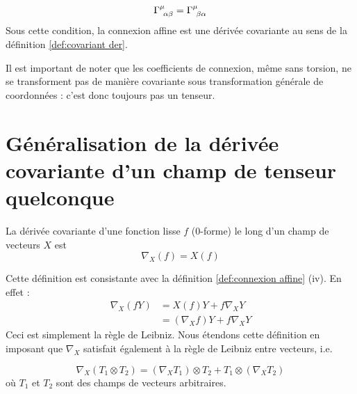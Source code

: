 \begin{equation}
    \Gamma\indices{^\mu_{\!\alpha\beta}} = \Gamma\indices{^\mu_{\!\beta \alpha}}
\end{equation}
Sous cette condition, la connexion affine est une dérivée covariante au sens de la définition \ref{def:covariant der}.
\begin{rmk}
    Il est important de noter que les coefficients de connexion, même sans torsion, ne se transforment pas de manière covariante sous transformation générale de coordonnées : c'est donc toujours pas un tenseur. 
\end{rmk}



\section{Généralisation de la dérivée covariante d'un champ de tenseur quelconque}
\begin{theoremframe}
    \begin{defi}
        La dérivée covariante d'une fonction lisse $f$ ($0$-forme) le long d'un champ de vecteurs $X$ est 
        \begin{equation}
            \nabla_{X}(f) = X(f)
            \label{dérivée covariante 0-forme}
        \end{equation}
    \end{defi}
\end{theoremframe}
Cette définition est consistante avec la définition \ref{def:connexion affine} (iv). En effet :
\begin{align*}
        \nabla_{X}(fY) &= X(f)Y + f\nabla_X Y\\
        &= (\nabla_X f)Y + f\nabla_X Y
    \label{regle de Liebniz}
\end{align*}
Ceci est simplement la règle de Leibniz. Nous étendons cette définition en imposant que $\nabla_X$ satisfait également à la règle de Leibniz entre vecteurs, i.e.

\begin{equation}
    \nabla_X(T_1 \otimes T_2) = (\nabla_XT_1)\otimes T_2 + T_1 \otimes (\nabla_X T_2)
    \label{Leibniz tenseur arbitraire}
\end{equation}
où $T_1$ et $T_2$ sont des champs de vecteurs arbitraires. 


